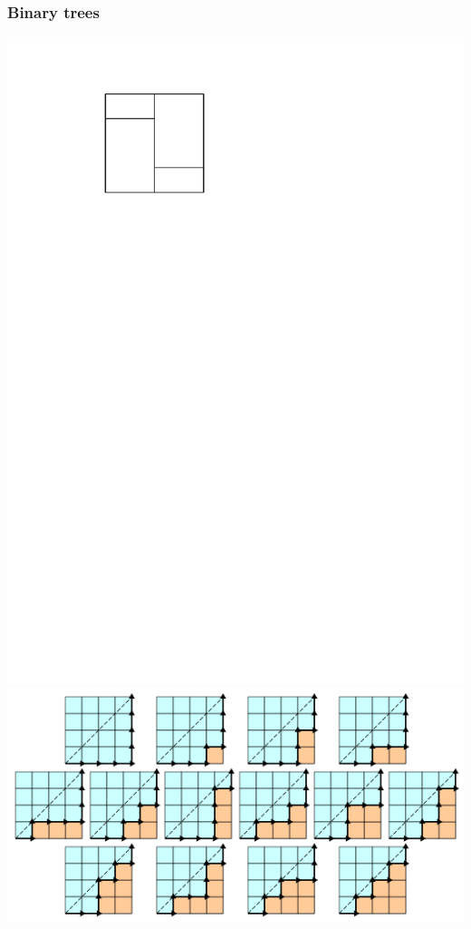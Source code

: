 \documentclass[11pt]{beamer}%
\begin{document}

\begin{frame}
  \frametitle{Binary trees}
  \begin{center}
      \includegraphics[page=4,height=.2\textheight]{figures.pdf} 
      \includegraphics[height=.2\textheight]{catalan1.png}\ \  

\end{center}
\end{frame}
\end{document}
